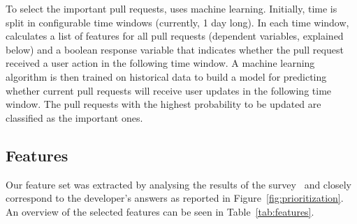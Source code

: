 \documentclass[conference]{IEEEtran}
\begin{document}
To select the important pull requests, \prioritizer uses machine learning.
Initially, time is split in configurable time windows (currently, 1 day long).
In each time window, \prioritizer calculates a list of features for all pull
requests (dependent variables, explained below) and a boolean response variable
that indicates whether the pull request received a user action in the following
time window. A machine learning algorithm is then trained on historical data to
build a model for predicting whether current pull requests will receive user
updates in the following time window. The pull requests with the highest
probability to be updated are classified as the important ones.

\subsection{Features}
\label{sec:features}
Our feature set was extracted by analysing the results of the
survey~\cite{GZSD15} and closely correspond to the developer's answers as
reported in Figure~\ref{fig:prioritization}. An overview of the selected
features can be seen in Table~\ref{tab:features}.
\end{document}
